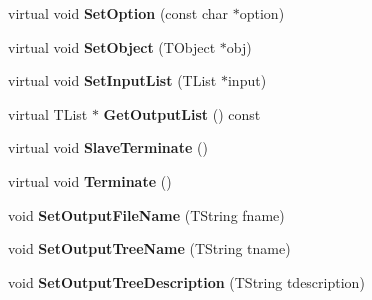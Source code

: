 \begin{DoxyCompactItemize}
\item 
\hypertarget{class_h_a_l_1_1_analysis_selector_a8e8f2ff599b95b4ea1437080f7a243e2}{virtual void {\bfseries Set\-Option} (const char $\ast$option)}\label{class_h_a_l_1_1_analysis_selector_a8e8f2ff599b95b4ea1437080f7a243e2}

\item 
\hypertarget{class_h_a_l_1_1_analysis_selector_a6c5b330612cbb40740a1773322f1bd4c}{virtual void {\bfseries Set\-Object} (T\-Object $\ast$obj)}\label{class_h_a_l_1_1_analysis_selector_a6c5b330612cbb40740a1773322f1bd4c}

\item 
\hypertarget{class_h_a_l_1_1_analysis_selector_a2ad21fe9c786a8b8ed9d2f2ed03b18dd}{virtual void {\bfseries Set\-Input\-List} (T\-List $\ast$input)}\label{class_h_a_l_1_1_analysis_selector_a2ad21fe9c786a8b8ed9d2f2ed03b18dd}

\item 
\hypertarget{class_h_a_l_1_1_analysis_selector_af839fdbf6d731039f3dfe2a28435cfa0}{virtual T\-List $\ast$ {\bfseries Get\-Output\-List} () const }\label{class_h_a_l_1_1_analysis_selector_af839fdbf6d731039f3dfe2a28435cfa0}

\item 
\hypertarget{class_h_a_l_1_1_analysis_selector_a83767cc68a8016682064a673b4cd3a81}{virtual void {\bfseries Slave\-Terminate} ()}\label{class_h_a_l_1_1_analysis_selector_a83767cc68a8016682064a673b4cd3a81}

\item 
\hypertarget{class_h_a_l_1_1_analysis_selector_a8b660b6a333cdefd12e1829389fbf0cd}{virtual void {\bfseries Terminate} ()}\label{class_h_a_l_1_1_analysis_selector_a8b660b6a333cdefd12e1829389fbf0cd}

\item 
\hypertarget{class_h_a_l_1_1_analysis_selector_a65b63a6f47a198031436edbea7818b1b}{void {\bfseries Set\-Output\-File\-Name} (T\-String fname)}\label{class_h_a_l_1_1_analysis_selector_a65b63a6f47a198031436edbea7818b1b}

\item 
\hypertarget{class_h_a_l_1_1_analysis_selector_a03cb0fb32fb595a20183a10651811a10}{void {\bfseries Set\-Output\-Tree\-Name} (T\-String tname)}\label{class_h_a_l_1_1_analysis_selector_a03cb0fb32fb595a20183a10651811a10}

\item 
\hypertarget{class_h_a_l_1_1_analysis_selector_ab1610526942d045e9bc1b2e4006575a5}{void {\bfseries Set\-Output\-Tree\-Description} (T\-String tdescription)}\label{class_h_a_l_1_1_analysis_selector_ab1610526942d045e9bc1b2e4006575a5}

\end{DoxyCompactItemize}
